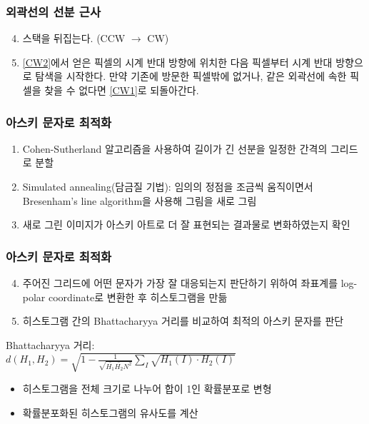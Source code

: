 \documentclass{beamer}
\begin{document}
	\begin{frame}{}
		\frametitle{외곽선의 선분 근사}
		\begin{enumerate}
			\setcounter{enumi}{3}
			\item 스택을 뒤집는다. (CCW $ \rightarrow $ CW)
			\item \ref{CW2}에서 얻은 픽셀의 시계 반대 방향에 위치한 다음 픽셀부터 시계 반대 방향으로 탐색을 시작한다.
			만약 기존에 방문한 픽셀밖에 없거나, 같은 외곽선에 속한 픽셀을 찾을 수 없다면 \ref{CW1}로 되돌아간다.
		\end{enumerate}
	\end{frame}
	\begin{frame}{}
		\frametitle{아스키 문자로 최적화}
		\begin{enumerate}
			\item Cohen-Sutherland 알고리즘을 사용하여 길이가 긴 선분을 일정한 간격의 그리드로 분할\cite{cohen-sutherland}
			\item Simulated annealing(담금질 기법): 임의의 정점을 조금씩 움직이면서 Bresenham's line algorithm을 사용해 그림을 새로 그림\cite{bresenham-line}
			\item 새로 그린 이미지가 아스키 아트로 더 잘 표현되는 결과물로 변화하였는지 확인
		\end{enumerate}	
	\end{frame}
	\begin{frame}{}
		\frametitle{아스키 문자로 최적화}
		\begin{enumerate}
			\setcounter{enumi}{3}
			\item 주어진 그리드에 어떤 문자가 가장 잘 대응되는지 판단하기 위하여 좌표계를 log-polar coordinate로 변환한 후 히스토그램을 만듦\cite{log-polar}
			\item 히스토그램 간의 Bhattacharyya 거리를 비교하여 최적의 아스키 문자를 판단\cite{bhattacharyya}
		\end{enumerate}
		\vspace{1em}
		Bhattacharyya 거리: \\
		\vspace{0.5em}
		\centering
		$ \displaystyle d(H_1,H_2) = \sqrt{1 - \frac{1}{\sqrt{\bar{H_1} \bar{H_2} N^2}} \sum_I \sqrt{H_1(I) \cdot H_2(I)}} $
		\vspace{0.5em}
		\begin{itemize}
			\item 히스토그램을 전체 크기로 나누어 합이 1인 확률분포로 변형
			\item 확률분포화된 히스토그램의 유사도를 계산
		\end{itemize}
	\end{frame}
\end{document}
